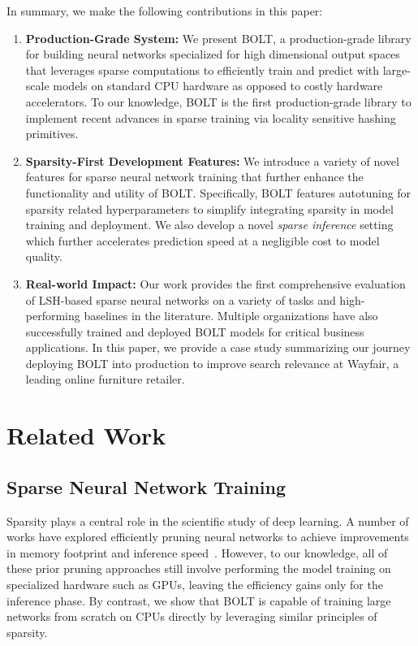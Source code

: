 \documentclass[sigconf]{acmart}
\begin{document}
In summary, we make the following contributions in this paper:
\begin{enumerate}
    \item \textbf{Production-Grade System:} We present BOLT, a production-grade library for building neural networks specialized for high dimensional output spaces that leverages sparse computations to efficiently train and predict with large-scale models on standard CPU hardware as opposed to costly hardware accelerators. To our knowledge, \textsc{BOLT} is the first production-grade library to implement recent advances in sparse training via locality sensitive hashing primitives.
    \item \textbf{Sparsity-First Development Features:} We introduce a variety of novel features for sparse neural network training that further enhance the functionality and utility of \textsc{BOLT}. Specifically, BOLT features autotuning for sparsity related hyperparameters to simplify integrating sparsity in model training and deployment. We also develop a novel \emph{sparse inference} setting which further accelerates prediction speed at a negligible cost to model quality.
    
\item \textbf{Real-world Impact:} Our work provides the first comprehensive evaluation of LSH-based sparse neural networks on a variety of tasks and high-performing baselines in the literature. Multiple organizations have also successfully trained and deployed BOLT models for critical business applications. In this paper, we provide a case study summarizing our journey deploying BOLT into production to improve search relevance at Wayfair, a leading online furniture retailer. 
    
\end{enumerate} 





\section{Related Work}

\subsection{Sparse Neural Network Training}

Sparsity plays a central role in the scientific study of deep learning. A number of works have explored efficiently pruning neural networks to achieve improvements in memory footprint and inference speed~\cite{sanh2020movement, frankle2020pruning, price2021dense, molchanov2016pruning, zhao2019variational}. However, to our knowledge, all of these prior pruning approaches still involve performing the model training on specialized hardware such as GPUs, leaving the efficiency gains only for the inference phase. By contrast, we show that BOLT is capable of training large networks from scratch on CPUs directly by leveraging similar principles of sparsity.
\end{document}
